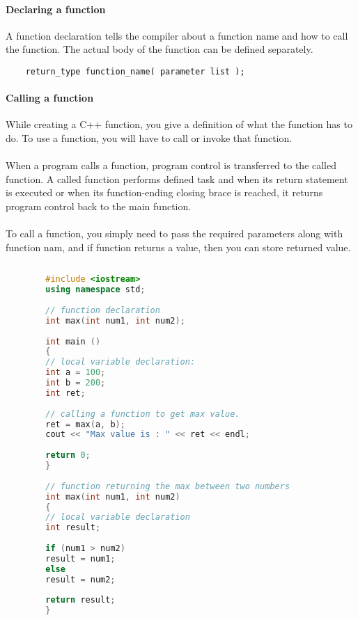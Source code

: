 \documentclass[11pt,fleqn]{book} %
\begin{document}
	\paragraph{Declaring a function}
	A function declaration tells the compiler about a function name and how to call the function. The actual body of the function can be defined separately.\\
	\begin{lstlisting}
	return_type function_name( parameter list );
	\end{lstlisting}
	\newpage
	\paragraph{Calling a function}
	While creating a C++ function, you give a definition of what the function has to do. To use a function, you will have to call or invoke that function. \\ ~\\
	When a program calls a function, program control is transferred to the called function. A called function performs defined task and when its return statement is executed or when its function-ending closing brace is reached, it returns program control back to the main function. \\ ~\\
	To call a function, you simply need to pass the required parameters along with function nam, and if function returns a value, then you can store returned value.\\
	
	\begin{example}
		\begin{lstlisting}[language=C++, caption = Declaration Definition and Calling of a max function]
		
		#include <iostream>
		using namespace std;
		
		// function declaration
		int max(int num1, int num2);
		
		int main () 
		{
		// local variable declaration:
		int a = 100;
		int b = 200;
		int ret;
		
		// calling a function to get max value.
		ret = max(a, b);
		cout << "Max value is : " << ret << endl;
		
		return 0;
		}
		
		// function returning the max between two numbers
		int max(int num1, int num2) 
		{
		// local variable declaration
		int result;
		
		if (num1 > num2)
		result = num1;
		else
		result = num2;
		
		return result; 
		}
		\end{lstlisting}
	\end{example}
	
\end{document}
